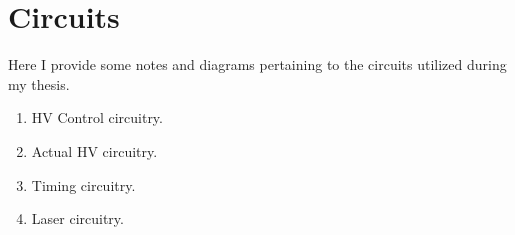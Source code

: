 \chapter{Circuits}	%

Here I provide some notes and diagrams pertaining to the circuits utilized during my thesis.

\begin{enumerate}

\item
HV Control circuitry.

\item
Actual HV circuitry.

\item
Timing circuitry.

\item
Laser circuitry.


\end{enumerate}
